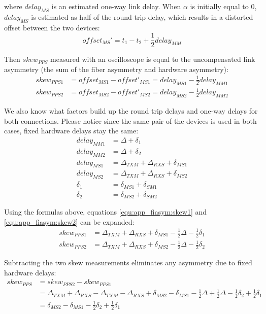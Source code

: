 \noindent where $delay_{MS}$ is an estimated one-way link delay. When $\alpha$ is
initially equal to 0, $delay_{MS}$ is estimated as half of the round-trip
delay, which results in a distorted offset between the two devices:
\begin{equation}
	offset_{MS}' = t_1 - t_2 + \frac{1}{2} delay_{MM}
\end{equation}

\noindent Then $skew_{PPS}$ measured with an oscilloscope is equal to the
uncompensated link asymmetry (the sum of the fiber asymmetry and hardware
asymmetry):
\begin{align}
  \label{equ:app_fiasym:skew1}
  skew_{PPS1} &= offset_{MS1} - offset'_{MS1} = delay_{MS1} - \frac{1}{2} delay_{MM1}\\
  \label{equ:app_fiasym:skew2}
  skew_{PPS2} &= offset_{MS2} - offset'_{MS2} = delay_{MS2} - \frac{1}{2} delay_{MM2}
\end{align}

\noindent We also know what factors build up the round trip delays and one-way
delays for both connections. Please notice since the same pair of the devices is
used in both cases, fixed hardware delays stay the same:
\begin{align}
  delay_{MM1} &= \Delta + \delta_1\\
  delay_{MM2} &= \Delta + \delta_2\\
  delay_{MS1} &= \Delta_{TXM} + \Delta_{RXS} + \delta_{MS1}\\
  delay_{MS2} &= \Delta_{TXM} + \Delta_{RXS} + \delta_{MS2}\\
     \delta_1 &= \delta_{MS1} + \delta_{SM1}\\
     \delta_2 &= \delta_{MS2} + \delta_{SM2}
\end{align}

\noindent Using the formulas above, equations \ref{equ:app_fiasym:skew1} and
\ref{equ:app_fiasym:skew2} can be expanded:
\begin{align}
  skew_{PPS1} &= \Delta_{TXM} + \Delta_{RXS} + \delta_{MS1} - \frac{1}{2}\Delta
  - \frac{1}{2} \delta_1\\
  skew_{PPS2} &= \Delta_{TXM} + \Delta_{RXS} + \delta_{MS2} - \frac{1}{2}\Delta
  - \frac{1}{2} \delta_2
\end{align}

\noindent Subtracting the two skew measurements eliminates any asymmetry due to
fixed hardware delays:
\begin{align}
  \label{equ:app_fiasym:skew_pps}
  skew_{PPS} &= skew_{PPS2} - skew_{PPS1}\\
             &= \Delta_{TXM} + \Delta_{RXS} -
  \Delta_{TXM} - \Delta_{RXS} + \delta_{MS2} - \delta_{MS1} - \frac{1}{2}\Delta + \frac{1}{2}\Delta -
  \frac{1}{2} \delta_2 + \frac{1}{2} \delta_1 \nonumber\\
  &= \delta_{MS2} - \delta_{MS1} - \frac{1}{2}\delta_2 + \frac{1}{2}\delta_1
\end{align}

